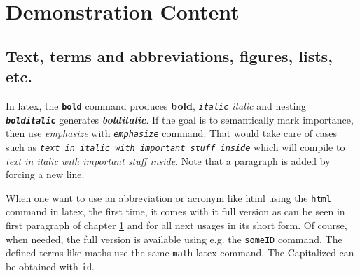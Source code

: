 \vspace{21.5pt}
\chapter{Demonstration Content}\label{demo:content}


\section{Text, terms and abbreviations, figures, lists, etc.}

In \gls{latex}, the \texttt{\textbf{bold}} command produces \textbf{bold}, \texttt{\textit{italic}}  \textit{italic} and nesting \texttt{\textbf{\textit{bolditalic}}} generates \textbf{\textit{bolditalic}}. If the goal is to semantically mark importance, then use \emph{emphasize} with \texttt{\emph{emphasize}} command. That would take care of cases such as \texttt{\textit{text in italic with \emph{important stuff} inside}} which will compile to \textit{text in italic with \emph{important stuff} inside}. Note that a paragraph is added by forcing a new line.

When one want to use an abbreviation or acronym like \gls{html} using the \texttt{\gls{html}} command in \gls{latex}, the first time, it comes with it full version as can be seen in first paragraph of chapter \ref{demo:content} and for all next usages in its short form. Of course, when needed, the full version is available using e.g. the \texttt{\acrlong{someID}} command. The defined terms like \gls{maths} use the same \texttt{\gls{math}} \gls{latex} command. The Capitalized can be obtained with \texttt{\Gls{id}}.

